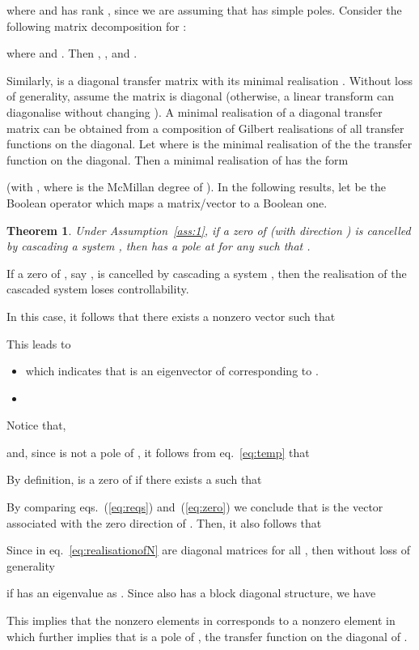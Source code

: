\documentclass[twocolumn,12pt]{autart}
\theoremstyle{plain}
\newtheorem{theorem}{Theorem}
\newenvironment{proof}[1][Proof]{\begin{trivlist} \item[\hskip \labelsep {\bfseries #1}]}{\end{trivlist}}
\begin{document}
where  and has
rank , since we are assuming that  has simple poles. Consider the following matrix decomposition for :

where  and
. Then , ,  and
.

Similarly,  is a diagonal transfer matrix with its minimal realisation . Without loss of generality, assume the matrix  is diagonal  (otherwise, a linear transform can diagonalise  without changing ). A minimal realisation of a diagonal transfer matrix can be obtained from a composition of Gilbert realisations of all transfer functions on the diagonal. Let  where  is the minimal realisation of the the  transfer function on the diagonal. Then a minimal realisation of  has the form

 (with , where  is the McMillan degree of ). In the following results, let  be the Boolean operator which maps a matrix/vector to a Boolean one.

\begin{theorem}\label{thm:cancelz}
Under Assumption~\ref{ass:1}, if a zero   of  (with direction ) is cancelled by cascading a system , then  has a pole at  for any  such that .
\end{theorem}
\begin{proof}
If a zero of , say , is cancelled by cascading a system , then the realisation of the cascaded system  loses controllability. 

In this case, it follows that there exists a nonzero vector  such that

This leads to 
\begin{itemize}
\item[1.] 
which indicates that  is an eigenvector of  corresponding to . 
\item[2.] 

\end{itemize}
Notice that, 

and, since  is not a pole of , it follows from eq.~\eqref{eq:temp} that

By definition,  is a zero of  if
there exists a  such that 

By comparing eqs.~(\ref{eq:reqs}) and~(\ref{eq:zero}) we conclude that  is the vector associated with the zero direction of . 
Then, it also follows that  

Since  in eq.~\eqref{eq:realisationofN} are diagonal matrices for all , then without loss of generality 

if  has an eigenvalue as . 
Since  also has a block diagonal structure,  we have 

This implies that the  nonzero elements in  corresponds to a nonzero element in  which further implies that  is a pole of , the  transfer function on the diagonal of . 
\end{proof}
\end{document}
